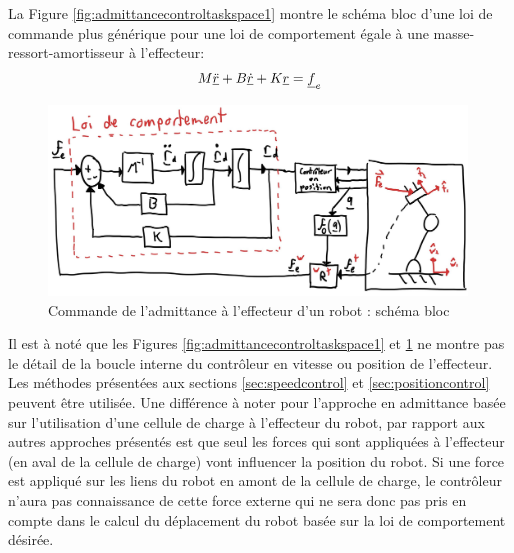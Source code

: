 La Figure \ref{fig:admittancecontroltaskspace1} montre le schéma bloc d'une loi de commande plus générique pour une loi de comportement égale à une masse-ressort-amortisseur à l'effecteur:
\begin{align}
M \underline{\ddot{r}} + B \underline{\dot{r}} + K \underline{r}= \underline{f}_e
\end{align}
\begin{figure}[h]
	\centering
		\includegraphics[width=0.99\textwidth]{fig/admittancecontroltaskspace.jpg}
	\caption{Commande de l'admittance à l'effecteur d'un robot : schéma bloc}
	\label{fig:admittancecontroltaskspace}
\end{figure}
Il est à noté que les Figures \ref{fig:admittancecontroltaskspace1} et \ref{fig:admittancecontroltaskspace} ne montre pas le détail de la boucle interne du contrôleur en vitesse ou position de l'effecteur. Les méthodes présentées aux sections \ref{sec:speedcontrol} et \ref{sec:positioncontrol} peuvent être utilisée. Une différence à noter pour l'approche en admittance basée sur l'utilisation d'une cellule de charge à l'effecteur du robot, par rapport aux autres approches présentés est que seul les forces qui sont appliquées à l'effecteur (en aval de la cellule de charge) vont influencer la position du robot. Si une force est appliqué sur les liens du robot en amont de la cellule de charge, le contrôleur n'aura pas connaissance de cette force externe qui ne sera donc pas pris en compte dans le calcul du déplacement du robot basée sur la loi de comportement désirée.


